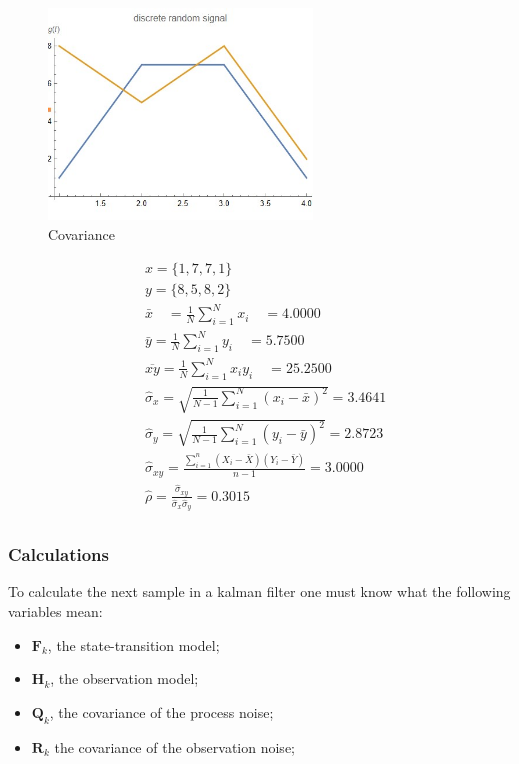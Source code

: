 \begin{figure}[ht]
 \centering
 \includegraphics[width=7cm]{images/covariance.jpg}
 \caption{Covariance}
 \label{fig:signal values}
\end{figure}
$$
\begin{aligned}
& x=\{1,7,7,1\} \\
& y=\{8,5,8,2\} \\
& \bar{x} \quad=\frac{1}{N} \sum_{i=1}^N x_i \quad=4.0000 \\
& \bar{y}=\frac{1}{N} \sum_{i=1}^N y_i \quad=5.7500 \\
& \overline{x y}=\frac{1}{N} \sum_{i=1}^N x_i y_i \quad=25.2500 \\
& \hat{\sigma}_x=\sqrt{\frac{1}{N-1} \sum_{i=1}^N\left(x_i-\bar{x}\right)^2}=3.4641 \\
& \hat{\sigma}_y=\sqrt{\frac{1}{N-1} \sum_{i=1}^N\left(y_i-\bar{y}\right)^2}=2.8723 \\
& \hat{\sigma}_{x y}=\frac{\sum_{i=1}^n\left(X_i-\bar{X}\right)\left(Y_i-\bar{Y}\right)}{n-1}=3.0000 \\
& \hat{\rho}=\frac{\hat{\sigma}_{x y}}{\hat{\sigma}_x \hat{\sigma}_y}={0.3015} \\
&
\end{aligned}
$$
\subsubsection{Calculations}
To calculate the next sample in a kalman filter one must know what the following variables mean: 
\begin{itemize}
  \item $\mathbf{F}_k$, the state-transition model;
  \item $\mathbf{H}_k$, the observation model;
  \item $\mathbf{Q}_k$, the covariance of the process noise;
  \item $\mathbf{R}_k$ the covariance of the observation noise;
\end{itemize}



